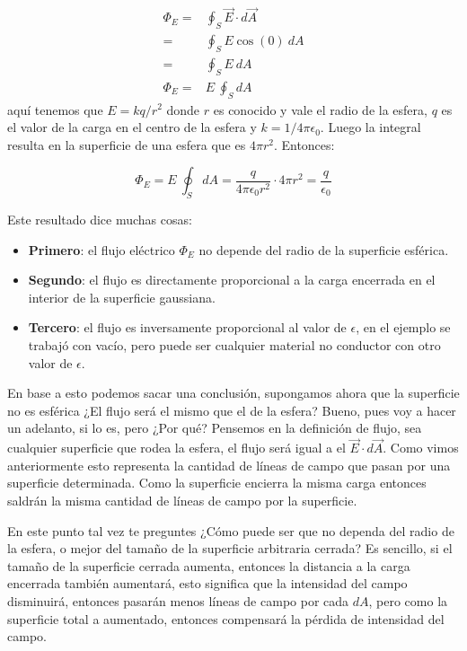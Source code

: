 \begin{align*}
    \Phi_E =& \oint_S \vec{E} \cdot d\vec{A} \\
            =& \oint_S E \cos(0) ~ dA \\
            =& \oint_S E ~ dA \\
    \Phi_E =& E ~ \oint_S dA
\end{align*}
aquí tenemos que \(E=kq/r^2\) donde \(r\) es conocido y vale el radio de la esfera, \(q\) es el valor de la carga en el centro de la esfera y \(k = 1/4\pi\epsilon_0\). Luego la integral resulta en la superficie de una esfera que es \(4\pi r^2\). Entonces:

\[
\Phi_E = E ~ \oint_S dA = \frac{q}{4\pi \epsilon_0 r^2} \cdot 4\pi r^2 = \boxed{\frac{q}{\epsilon_0}} 
\]

Este resultado dice muchas cosas:
\begin{itemize}
    \item \textbf{Primero}: el flujo eléctrico \(\Phi_E\) no depende del radio de la superficie esférica.
    \item \textbf{Segundo}: el flujo es directamente proporcional a la carga encerrada en el interior de la superficie gaussiana.
    \item \textbf{Tercero}: el flujo es inversamente proporcional al valor de \(\epsilon\), en el ejemplo se trabajó con vacío, pero puede ser cualquier material no conductor con otro valor de \(\epsilon\).
\end{itemize}

En base a esto podemos sacar una conclusión, supongamos ahora que la superficie no es esférica ¿El flujo será el mismo que el de la esfera? Bueno, pues voy a hacer un adelanto, si lo es, pero ¿Por qué? Pensemos en la definición de flujo, sea cualquier superficie que rodea la esfera, el flujo será igual a el \(\vec{E}\cdot d\vec{A}\). Como vimos anteriormente esto representa la cantidad de líneas de campo que pasan por una superficie determinada. Como la superficie encierra la misma carga entonces saldrán la misma cantidad de líneas de campo por la superficie.

En este punto tal vez te preguntes ¿Cómo puede ser que no dependa del radio de la esfera, o mejor del tamaño de la superficie arbitraria cerrada? Es sencillo, si el tamaño de la superficie cerrada aumenta, entonces la distancia a la carga encerrada también aumentará, esto significa que la intensidad del campo disminuirá, entonces pasarán menos líneas de campo por cada \(dA\), pero como la superficie total a aumentado, entonces compensará la pérdida de intensidad del campo.

